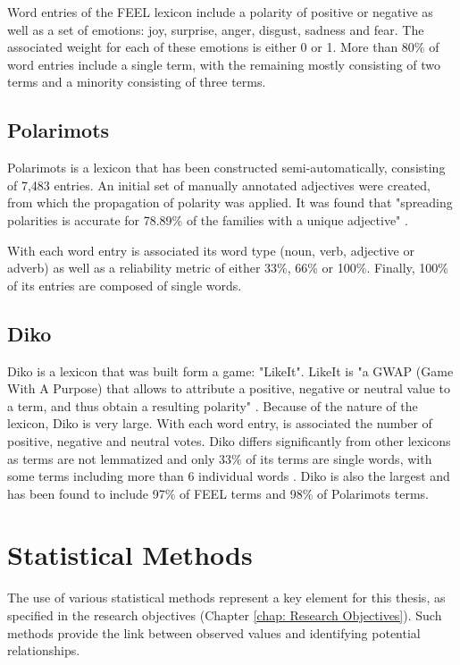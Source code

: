Word entries of the FEEL lexicon include a polarity of positive or negative as well as a set of emotions: joy, surprise, anger, disgust, sadness and fear. The associated weight for each of these emotions is either 0 or 1. More than 80\% of word entries include a single term, with the remaining mostly consisting of two terms and a minority consisting of three terms.

\subsection{Polarimots}\label{chap: polarimots}

Polarimots \citep{gala2012propagation} is a lexicon that has been constructed semi-automatically, consisting of 7,483 entries. An initial set of manually annotated adjectives were created, from which the propagation of polarity was applied. It was found that "spreading polarities is accurate for 78.89\% of the families with a unique adjective" \citep{gala2012propagation}.

With each word entry is associated its word type (noun, verb, adjective or adverb) as well as a reliability metric of either 33\%, 66\% or 100\%. Finally, 100\% of its entries are composed of single words.

\subsection{Diko}\label{chap: diko}

Diko is a lexicon that was built form a game: "LikeIt". LikeIt is "a GWAP (Game With A Purpose) that allows to attribute a positive, negative or neutral value to a term, and thus obtain a resulting polarity" \citep{lafourcade2015collecting}. Because of the nature of the lexicon, Diko is very large. With each word entry, is associated the number of positive, negative and neutral votes. Diko differs significantly from other lexicons as terms are not lemmatized and only 33\% of its terms are single words, with some terms including more than 6 individual words \citep{abdaoui2017feel}. Diko is also the largest and has been found to include 97\% of FEEL terms and 98\% of Polarimots terms.

\section{Statistical Methods}\label{Statistical Methods}

The use of various statistical methods represent a key element for this thesis, as specified in the research objectives (Chapter \ref{chap: Research Objectives}). Such methods provide the link between observed values and identifying potential relationships.

